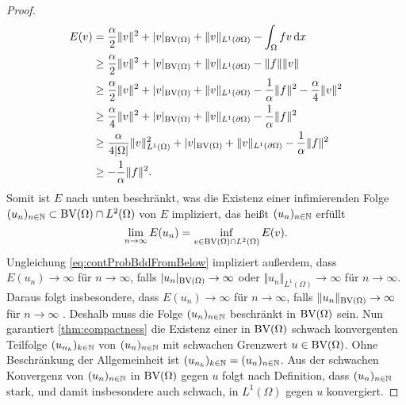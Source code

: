 \begin{proof}
  \begin{equation}
    \label{eq:contProbBddFromBelow}
    \begin{aligned}
      E(v)&=\frac{\alpha}{2}\Vert v\Vert^2 + |v|_{\textup{BV}(\Omega)}
      +\Vert v\Vert_{L^1(\partial\Omega)}-\int_\Omega fv\,\mathrm{d}x\\
      &\geq 
      \frac{\alpha}{2}\Vert v\Vert^2 + |v|_{\textup{BV}(\Omega)}
      +\Vert v\Vert_{L^1(\partial\Omega)}
      -\Vert f\Vert\Vert v\Vert\\
      &\geq 
      \frac{\alpha}{2}\Vert v\Vert^2 + |v|_{\textup{BV}(\Omega)}
      +\Vert v\Vert_{L^1(\partial\Omega)}
      -\frac{1}{\alpha}\Vert f\Vert^2
      -\frac{\alpha}{4}\Vert v\Vert^2\\
      &\geq 
      \frac{\alpha}{4}\Vert v\Vert^2 + |v|_{\textup{BV}(\Omega)}
      +\Vert v\Vert_{L^1(\partial\Omega)}-\frac{1}{\alpha}\Vert
      f\Vert^2\\
      &\geq 
      \frac{\alpha}{4|\Omega|}\Vert v\Vert_{L^1(\Omega)}^2 + |v|_{\textup{BV}(\Omega)}
      +\Vert v\Vert_{L^1(\partial\Omega)}-\frac{1}{\alpha}\Vert
      f\Vert^2\\
      &\geq -\frac{1}{\alpha}\Vert f\Vert^2.
    \end{aligned}
  \end{equation}
  Somit ist $E$ nach unten beschränkt, was die Existenz einer infimierenden
  Folge $(u_n)_{n\in\mathbb{N}}\subset\textup{BV}(\Omega)\cap L^2(\Omega)$ von $E$ 
  impliziert, das heißt
  $(u_n)_{n\in\mathbb{N}}$ erfüllt $$\lim_{n\rightarrow\infty}E(u_n) =
  \inf_{v\in\textup{BV}(\Omega)\cap L^2(\Omega)}E(v).$$ 
  Ungleichung \eqref{eq:contProbBddFromBelow} impliziert außerdem, dass
  $E(u_n)\to\infty$ für $n\to\infty$, falls $|u_n|_{\textup{BV}(\Omega)}\to\infty$ oder
  $\Vert u_n\Vert_{L^1(\Omega)}\to\infty$ für $n\to\infty$. 
  Daraus folgt insbesondere, dass $E(u_n)\to\infty$ für $n\to\infty$, falls
  $\Vert u_n\Vert_{\textup{BV}(\Omega)}\to\infty$ für $n\to\infty$ .
  Deshalb muss die Folge $(u_n)_{n\in\mathbb{N}}$ beschränkt in $\textup{BV}(\Omega)$ sein.
  Nun garantiert \cref{thm:compactness} die Existenz einer in $\textup{BV}(\Omega)$
  schwach konvergenten Teilfolge $(u_{n_k})_{k\in\mathbb{N}}$ von $(u_n)_{n\in\mathbb{N}}$
  mit schwachen Grenzwert $u\in\textup{BV}(\Omega)$. 
  Ohne Beschränkung der Allgemeinheit ist
  $(u_{n_k})_{k\in\mathbb{N}}=(u_n)_{n\in\mathbb{N}}$.
  Aus der schwachen Konvergenz von $(u_n)_{n\in\mathbb{N}}$ in $\textup{BV}(\Omega)$ gegen
  $u$ folgt nach Definition, dass $(u_n)_{n\in\mathbb{N}}$ stark, und damit
  insbesondere auch schwach, in $L^1(\Omega)$ gegen $u$ konvergiert.


\end{proof}
